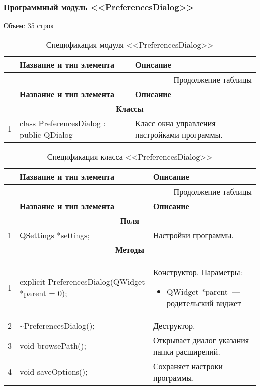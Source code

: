 \subsubsection*{Программный модуль <<PreferencesDialog>>}
Объем: 35 строк

\small
\singlespacing
\begin{longtable}[h]{|p{}|p{}|p{}|}
  \caption{Спецификация модуля <<PreferencesDialog>>}
	\\ \hline
	  \textbf{\No}                  &
	  \textbf{Название и тип элемента}  &
	  \textbf{Описание}
	\\ \hline
  \endfirsthead

  \multicolumn{3}{r}{Продолжение таблицы \thetable{}}
  \\ \hline
	  \textbf{\No}                  &
	  \textbf{Название и тип элемента}  &
	  \textbf{Описание}
	\\ \hline
  \endhead


  \multicolumn{3}{|c|}{\textbf{Классы}} \\
  \hline
  1 & class PreferencesDialog : public QDialog & Класс окна управления настройками программы. \\ \hline
\end{longtable}
\normalsize
\onehalfspacing


\small
\singlespacing
\begin{longtable}[h]{|p{}|p{}|p{}|}
  \caption{Спецификация класса <<PreferencesDialog>>}
	\\ \hline
	  \textbf{\No}                  &
	  \textbf{Название и тип элемента}  &
	  \textbf{Описание}
	\\ \hline
  \endfirsthead

  \multicolumn{3}{r}{Продолжение таблицы \thetable{}}
  \\ \hline
	  \textbf{\No}                  &
	  \textbf{Название и тип элемента}  &
	  \textbf{Описание}
	\\ \hline
  \endhead

  \multicolumn{3}{|c|}{\textbf{Поля}} \\
  \hline
  1 & QSettings *settings; & Настройки программы. \\ \hline

  \multicolumn{3}{|c|}{\textbf{Методы}} \\
  \hline
  1 & explicit PreferencesDialog(QWidget *parent = 0); &
    Конструктор.\newline
    \uline{Параметры:}
    \begin{itemize}[nolistsep,label=,leftmargin=0cm]
      \item QWidget *parent~--- родительский виджет
    \end{itemize}\\ \hline
  2 & \textasciitilde PreferencesDialog(); & Деструктор. \\ \hline
  3 & void browsePath(); & Открывает диалог указания папки расширений. \\ \hline
  4 & void saveOptions(); & Сохраняет настроки программы. \\ \hline
\end{longtable}
\normalsize
\onehalfspacing


